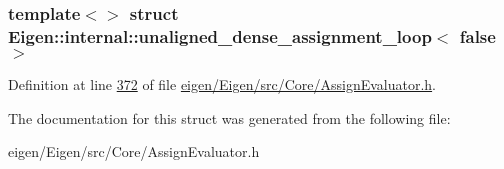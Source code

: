 \subsubsection*{template$<$$>$\newline
struct Eigen\+::internal\+::unaligned\+\_\+dense\+\_\+assignment\+\_\+loop$<$ false $>$}



Definition at line \hyperlink{eigen_2_eigen_2src_2_core_2_assign_evaluator_8h_source_l00372}{372} of file \hyperlink{eigen_2_eigen_2src_2_core_2_assign_evaluator_8h_source}{eigen/\+Eigen/src/\+Core/\+Assign\+Evaluator.\+h}.



The documentation for this struct was generated from the following file\+:\begin{DoxyCompactItemize}
\item 
eigen/\+Eigen/src/\+Core/\+Assign\+Evaluator.\+h\end{DoxyCompactItemize}
